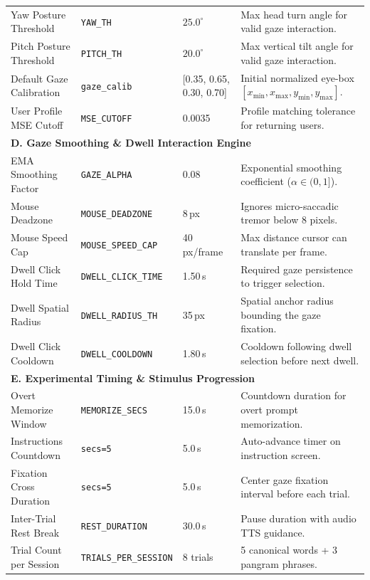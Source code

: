 \documentclass[11pt,a4paper]{article}
\begin{document}
\begin{table}[H]
\begin{tabularx}{\textwidth}{p{} p{} p{} X}
Yaw Posture Threshold & \texttt{YAW\_TH} & $25.0^\circ$ & Max head turn angle for valid gaze interaction. \\
Pitch Posture Threshold & \texttt{PITCH\_TH} & $20.0^\circ$ & Max vertical tilt angle for valid gaze interaction. \\
Default Gaze Calibration & \texttt{gaze\_calib} & [0.35, 0.65, 0.30, 0.70] & Initial normalized eye-box $[x_{\min}, x_{\max}, y_{\min}, y_{\max}]$. \\
User Profile MSE Cutoff & \texttt{MSE\_CUTOFF} & 0.0035 & Profile matching tolerance for returning users. \\
\midrule
\multicolumn{4}{l}{\textbf{D. Gaze Smoothing \& Dwell Interaction Engine}} \\
EMA Smoothing Factor & \texttt{GAZE\_ALPHA} & 0.08 & Exponential smoothing coefficient ($\alpha \in (0, 1]$). \\
Mouse Deadzone & \texttt{MOUSE\_DEADZONE} & 8\,px & Ignores micro-saccadic tremor below 8 pixels. \\
Mouse Speed Cap & \texttt{MOUSE\_SPEED\_CAP} & 40\,px/frame & Max distance cursor can translate per frame. \\
Dwell Click Hold Time & \texttt{DWELL\_CLICK\_TIME} & 1.50\,s & Required gaze persistence to trigger selection. \\
Dwell Spatial Radius & \texttt{DWELL\_RADIUS\_TH} & 35\,px & Spatial anchor radius bounding the gaze fixation. \\
Dwell Click Cooldown & \texttt{DWELL\_COOLDOWN} & 1.80\,s & Cooldown following dwell selection before next dwell. \\
\midrule
\multicolumn{4}{l}{\textbf{E. Experimental Timing \& Stimulus Progression}} \\
Overt Memorize Window & \texttt{MEMORIZE\_SECS} & 15.0\,s & Countdown duration for overt prompt memorization. \\
Instructions Countdown & \texttt{secs=5} & 5.0\,s & Auto-advance timer on instruction screen. \\
Fixation Cross Duration & \texttt{secs=5} & 5.0\,s & Center gaze fixation interval before each trial. \\
Inter-Trial Rest Break & \texttt{REST\_DURATION} & 30.0\,s & Pause duration with audio TTS guidance. \\
Trial Count per Session & \texttt{TRIALS\_PER\_SESSION} & 8 trials & 5 canonical words + 3 pangram phrases. \\
\bottomrule
\end{tabularx}
\end{table}
\end{document}
